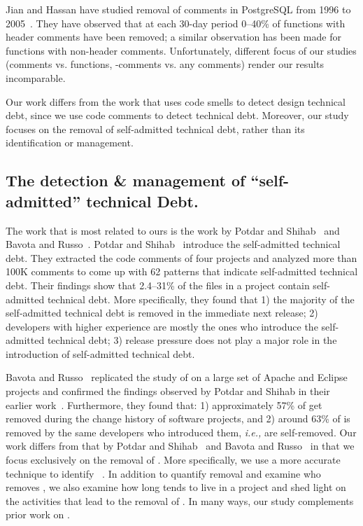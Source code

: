 Jian and Hassan have studied removal of comments in PostgreSQL from 1996 to 2005~\cite{Jiang:Hassan}. They have observed that at each 30-day period 0--40\% of functions with header comments have been removed; a similar observation has been made for functions with non-header comments. Unfortunately, different focus of our studies (comments vs. functions, \SATD-comments vs. any comments) render our results incomparable.


Our work differs from the work that uses code smells to detect design technical debt, since we use code comments to detect technical debt. Moreover, our study focuses on the removal of self-admitted technical debt, rather than its identification or management.




\subsection{The detection \& management of ``self-admitted'' technical Debt.} 
The work that is most related to ours is the work by Potdar and Shihab~\cite{Potdar2014ICSME} and Bavota and Russo~\cite{Bavota2016MSR}. Potdar and Shihab~\cite{Potdar2014ICSME} introduce the self-admitted technical debt. They extracted the code comments of four projects and analyzed more than 100K comments to come up with 62  patterns that indicate self-admitted technical debt. Their findings show that 2.4--31\% of the files in a project contain self-admitted technical debt. More specifically, they found that 1) the majority of the self-admitted technical debt is removed in the immediate next release; 2) developers with higher experience are mostly the ones who introduce the self-admitted technical debt; 3) release pressure does not play a major role in the introduction of self-admitted technical debt. 

Bavota and Russo~\cite{Bavota2016MSR} replicated the study of \SATD on a large set of Apache and Eclipse projects and confirmed the findings observed by Potdar and Shihab in their earlier work~\cite{Potdar2014ICSME}. Furthermore, they found that: 1) approximately 57\% of \SATD get removed during the change history of software projects, and 2) around 63\% of \SATD is removed by the same developers who introduced them, \emph{i.e.,} are self-removed. Our work differs from that by Potdar and Shihab~\cite{Potdar2014ICSME} and Bavota and Russo~\cite{Bavota2016MSR} in that we focus exclusively on the removal of \SATD. More specifically,  we use a more accurate technique to identify \SATD~\cite{Maldonado2015TSE}. In addition to quantify removal and examine who removes \SATD, we also examine how long \SATD tends to live in a project and shed light on the activities that lead to the removal of \SATD. In many ways, our study complements prior work on \SATD.

